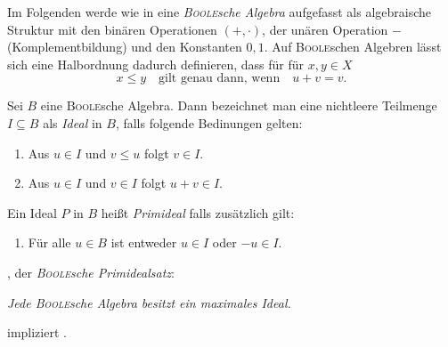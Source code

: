 Im Folgenden werde wie in \cite{jech2008axiom} eine \textit{\textsc{Boole}sche Algebra} aufgefasst als algebraische Struktur mit den binären Operationen $(+,\cdot)$, der unären Operation $-$ (Komplementbildung) und den Konstanten $0,1$. 
Auf \textsc{Boole}schen Algebren lässt sich eine Halbordnung dadurch definieren, dass für für $x,y \in X$ 
\begin{displaymath}
  x \leq y \quad \text{gilt genau dann, wenn} \quad u + v = v.
\end{displaymath}

\begin{defn}
  Sei $B$ eine \textsc{Boole}sche Algebra. Dann bezeichnet man eine nichtleere Teilmenge $I \subseteq B$ als \textit{Ideal} in $B$, falls folgende Bedinungen gelten:
  \begin{enumerate}[(1)]
    \item Aus $u \in I$ und $v \leq u$ folgt  $v \in I$.
    \item Aus $u \in I$ und $v \in I$ folgt $u + v \in I$.
  \end{enumerate}
  Ein Ideal $P$ in $B$ heißt \textit{Primideal} falls zusätzlich gilt:
  \begin{enumerate}[(3)]
    \item Für alle $u \in B$ ist entweder $u \in I$ oder $-u \in I$.
  \end{enumerate}
\end{defn}

\begin{defn}
    \PIT, der \textit{\textsc{Boole}sche Primidealsatz}:
      \begin{addmargin}[2em]{2em}%
        \textit{Jede \textsc{Boole}sche Algebra besitzt ein maximales Ideal.}
      \end{addmargin}
\end{defn}

\begin{thm}
  \label{thm:acpit}
  \AC impliziert \PIT.
\end{thm}

